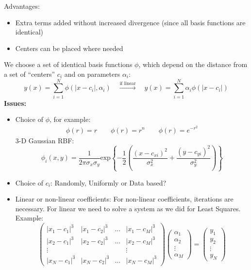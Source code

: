 \documentclass[8pt,a4paper]{scrartcl}
\renewcommand{\compaq}{\setlength{\itemsep}{0mm}\setlength{\parskip}{0cm}}
\begin{document}
\begin{multicols*}{3}
Advantages:
\begin{itemize}
\item Extra terms added without increased divergence (since all basis functions are identical)
\item Centers can be placed where needed
\end{itemize}
We choose a set of identical basis functions $\phi$, which depend on the distance from a set of ``centers'' $c_i$ and on parameters $\alpha_i$:
\begin{equation*}
y(x) = \sum_{i=1}^{N} \phi(|x-c_i|,\alpha_i) \quad \xrightarrow{\text{if linear}} \quad y(x) = \sum_{i=1}^{N} \alpha_i \phi(|x-c_i|)
\end{equation*}
\textbf{Issues:}
\begin{itemize}\compaq
\item Choice of $\phi$, for example:
\begin{align*}
\phi(r) = r \quad   \quad
\phi(r) = r^n \quad  \quad
\phi(r) = e^{-r^2}
\end{align*}
3-D Gaussian RBF:
\begin{equation*}
\phi_i(x,y) = \frac{1}{2\pi \sigma_x \sigma_y}  \text{exp} \left\{ - \frac{1}{2} \left( \frac{(x-c_{xi})^2}{\sigma_x^2} + \frac{(y-c_{yi})^2}{\sigma_y^2} \right) \right\}
\end{equation*}
\item Choice of $c_i$: Randomly, Uniformly or Data based?\\
\item Linear or non-linear coefficients: For non-linear coefficients, iterations are necessary. For linear we need to solve a system as we did for Least Squares. Example:
\begin{equation*}
\begin{pmatrix}
|x_1-c_1|^3  & |x_1-c_2|^3  & \dots & |x_1-c_M|^3  \\
|x_2-c_1|^3  &|x_2-c_2|^3  & \dots & |x_2-c_M|^3  \\
\vdots &  &  & \vdots \\
|x_N-c_1|^3  & |x_N-c_2|^3  & \dots &|x_N-c_M|^3
\end{pmatrix}
\begin{pmatrix}
\alpha_1\\
\alpha_2\\
\vdots \\
\alpha_M
\end{pmatrix}
=
\begin{pmatrix}
y_1\\
y_2\\
\vdots \\
y_N
\end{pmatrix}
\end{equation*}
\end{itemize}


\end{multicols*}
\end{document}
